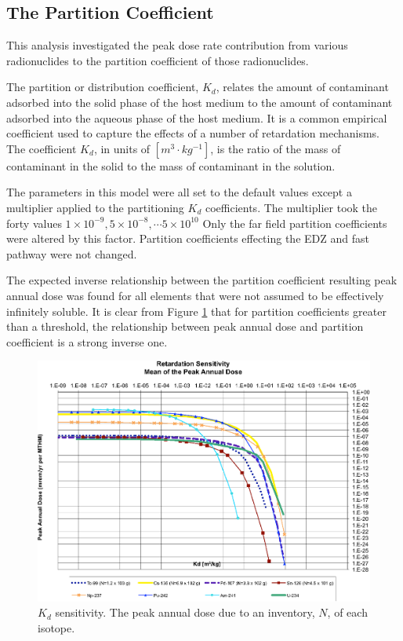 
\subsection{The Partition Coefficient}

This analysis investigated the peak dose rate contribution from various 
radionuclides to the partition coefficient of those radionuclides. 

The partition or distribution coefficient, $K_d$, relates the amount of contaminant adsorbed into the 
solid phase of the host medium to the amount of contaminant adsorbed into the 
aqueous phase of the host medium. It is a common empirical coefficient used to 
capture the effects of a number of retardation mechanisms. The coefficient 
$K_d$, in units of $[m^3\cdot kg^{-1}]$, is the ratio of the mass of contaminant in the 
solid to the mass of contaminant in the solution.

The parameters in this model were all set to the default values except a multiplier 
applied to the partitioning $K_d$ coefficients. The multiplier took the forty values $1\times10^{-9}, 5\times10^{-8}, \cdots 
5\times10^{10}$ Only the far field partition coefficients were altered by this 
factor. Partition coefficients effecting the EDZ and fast pathway were not 
changed.

The expected inverse relationship between the partition coefficient resulting 
peak annual dose was found for all elements that were not assumed to be 
effectively infinitely soluble.  It is clear from Figure \ref{fig:KdSum} that 
for partition coefficients greater than a threshold, the relationship between 
peak annual dose and partition coefficient is a strong inverse one. 

\begin{figure}[ht]
  \centering
  \includegraphics[width=\linewidth]{Partitioning_Summary.eps}
  \caption{$K_d$ sensitivity.  The peak annual dose due to an inventory, 
  $N$, of each isotope.}
  \label{fig:KdSum}
\end{figure}

